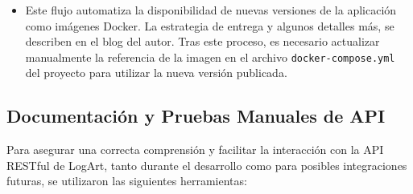 \begin{itemize}
\begin{itemize}
\begin{enumerate}
                    \end{enumerate}
                \item Este flujo automatiza la disponibilidad de nuevas versiones de la aplicación como imágenes Docker. La estrategia de entrega y algunos detalles más, se describen en el blog del autor\cite{MorenoCDLogArt}. Tras este proceso, es necesario actualizar manualmente la referencia de la imagen en el archivo \texttt{docker-compose.yml} del proyecto para utilizar la nueva versión publicada.
            \end{itemize}
    \end{itemize}

\subsection{Documentación y Pruebas Manuales de API}
\label{sec:docuPruebasApi}

Para asegurar una correcta comprensión y facilitar la interacción con la API RESTful de LogArt, tanto durante el desarrollo como para posibles integraciones futuras, se utilizaron las siguientes herramientas:

